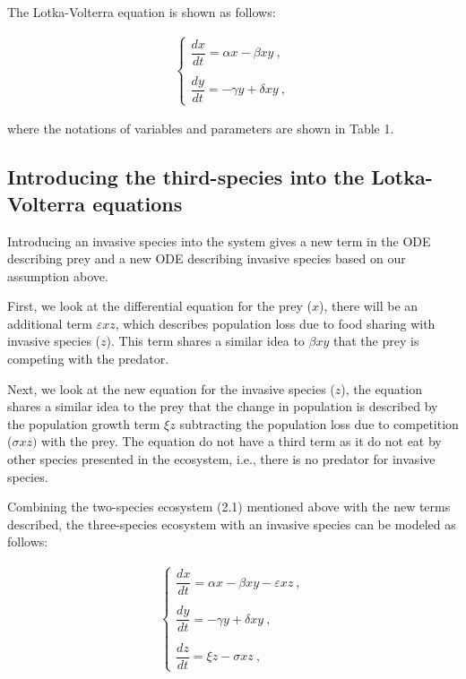 \documentclass{article}
\begin{document}
\noindent The Lotka-Volterra equation is shown as follows:

\begin{align*}
    \begin{cases}
        \dfrac{dx}{dt} = \alpha x - \beta x y \ , \\
        \\
        \dfrac{dy}{dt} = -\gamma y + \delta x y \ ,
    \end{cases}   \tag{2.1}
\end{align*}

\noindent where the notations of variables and parameters are shown in Table 1.

\subsection{Introducing the third-species into the Lotka-Volterra equations}
\noindent Introducing an invasive species into the system gives a new term in the ODE describing prey and a new ODE describing invasive species based on our assumption above. 

\vspace{5mm}

\noindent First, we look at the differential equation for the prey ($x$), there will be an additional term $\varepsilon xz$, which describes population loss due to food sharing with invasive species ($z$). This term shares a similar idea to $\beta xy$ that the prey is competing with the predator. 

\vspace{5mm}

\noindent Next, we look at the new equation for the invasive species ($z$), the equation shares a similar idea to the prey that the change in population is described by the population growth term $\xi z$ subtracting the population loss due to competition ($\sigma xz)$ with the prey. The equation do not have a third term as it do not eat by other species presented in the ecosystem, i.e., there is no predator for invasive species.

\vspace{5mm}

\noindent Combining the two-species ecosystem (2.1) mentioned above with the new terms described, the three-species ecosystem with an invasive species can be modeled as follows:

\begin{align*}
    \begin{cases}
        \dfrac{dx}{dt} = \alpha x - \beta x y - \varepsilon x z\ ,  \\
        \\
        \dfrac{dy}{dt} = -\gamma y + \delta x y \ , \\
        \\
        \dfrac{dz}{dt} = \xi z - \sigma x z \ ,
    \end{cases} \tag{2.2}
\end{align*}
\end{document}
